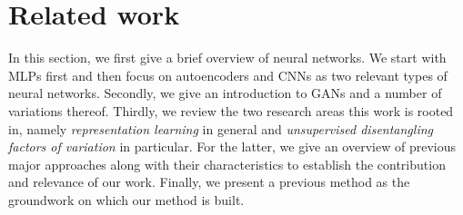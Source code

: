 \documentclass[12pt,a4paper]{article}
\begin{document}
\section{Related work}\label{sec:related_work}
In this section, we first give a brief overview of neural networks. We start with MLPs first and then focus on autoencoders and CNNs as two relevant types of neural networks. Secondly, we give an introduction to GANs and a number of variations thereof. Thirdly, we review the two research areas this work is rooted in, namely \textit{representation learning} in general and \textit{unsupervised disentangling factors of variation} in particular. For the latter, we give an overview of previous major approaches along with their characteristics to establish the contribution and relevance of our work. Finally, we present a previous method as the groundwork on which our method is built.
\end{document}
